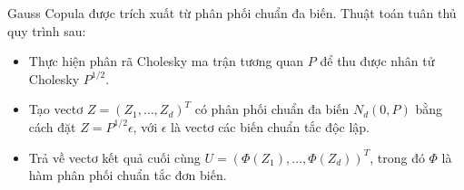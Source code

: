 Gauss Copula được trích xuất từ phân phối chuẩn đa biến. Thuật toán tuân thủ quy trình sau:
\begin{itemize}
    \item Thực hiện phân rã Cholesky ma trận tương quan $P$ để thu được nhân tử Cholesky $P^{1/2}$.
    \item Tạo vectơ $Z = (Z_1, \dots, Z_d)^T$ có phân phối chuẩn đa biến $N_d(0, P)$ bằng cách đặt $Z = P^{1/2}\epsilon$, với $\epsilon$ là vectơ các biến chuẩn tắc độc lập.
    \item Trả về vectơ kết quả cuối cùng $U = (\Phi(Z_1), \dots, \Phi(Z_d))^T$, trong đó $\Phi$ là hàm phân phối chuẩn tắc đơn biến.
\end{itemize}